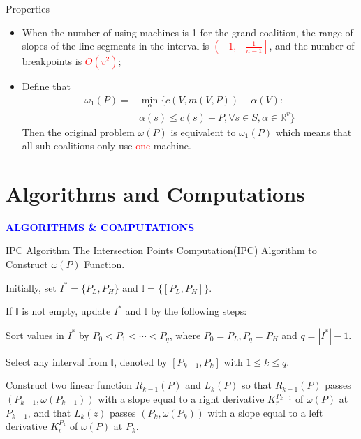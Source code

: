 \documentclass[14pt]{beamer}
\begin{document}
\begin{frame}{Properties}
	\vspace{-1mm}
		\begin{itemize}
		\justifying
			\item When the number of using machines is 1 for the grand coalition, the range of slopes of the line segments in the interval is \textcolor{red}{$\left( -1 , -\frac{1}{n-1} \right]$}, and the number of breakpoints is \textcolor{red}{$ O(v^2)$};
			\pause
			\item Define that
			\begin{eqnarray*}
			{\omega_1(P)}=&\mathop{\min}_{\alpha}\{c(V,m(V,P))-\alpha(V): \\
			&\alpha(s)\leq c(s)+P,\forall s \in S, \alpha\in\mathbb{R}^{v}\}
			\end{eqnarray*}
			Then the original problem $\omega(P)$ is equivalent to $\omega_1(P)$ which means that all sub-coalitions only use \textcolor{red}{one} machine.

	\end{itemize}
\end{frame}

\section{Algorithms and Computations}
\begin{frame}
\centering
\large
\textcolor{blue}{\bf {\huge A}LGORITHMS \&  {\huge C}OMPUTATIONS}
\end{frame}

\begin{frame}{IPC Algorithm}
	\vspace{-13mm}
	The Intersection Points Computation(IPC) Algorithm to Construct $\omega(P)$ Function.
	\begin{description}
	\justifying
	\footnotesize
	\vspace{3mm}
	\item[Step 1.] Initially, set $I^*=\{P_L,P_H\}$ and $\mathbb{I}= \{[P_L,P_H]\}$.
  \item[Step 2.] If $\mathbb{I}$ is not empty, update $I^*$ and $\mathbb{I}$ by the following steps:
  \item[Step 3.] Sort values in $I^*$ by $P_0<P_1<\cdots<P_q$, where $P_0 = P_L,P_q = P_H$ and $q = |I^*|-1$.
  \item[Step 4.]
  Select any interval from $\mathbb{I}$, denoted by $[P_{k-1},P_{k}]$ with $1\leq k \leq q$.
	\item[Step 5.]
	Construct two linear function $ R_{k-1}(P)$ and $ L_{k}(P)$ so that $ R_{k-1}(P)$ passes $(P_{k-1},\omega(P_{k-1}))$ with a slope equal to a right derivative $K_{r}^{P_{k-1}}$ of $\omega(P)$ at $P_{k-1}$, and that $L_{k}(z)$ passes $(P_{k},\omega(P_{k}))$ with a slope equal to a left derivative $K_{l}^{P_{k}}$ of $\omega(P)$ at $P_k$.
	\end{description}
\end{frame}
\end{document}
